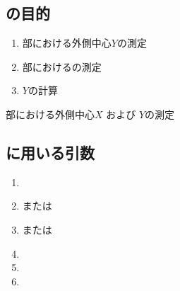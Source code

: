 \subsection{\MYOThickness の目的}
\begin{enumerate}[label*=\sarrow]
\item \EndFace 部における外側中心$Y$の測定
\item \EndFace 部における\BDOD の測定
\item \KeywayCenter$Y$の計算
\end{enumerate}
\EndFace 部における外側中心$X$ および \HorizontalOD$Y$の測定


\subsection{\MYOThickness に用いる引数\TBW}
\begin{enumerate}[label*=\sarrow]
\item \PMACOD
\item \PMTopReAlocationLength または\PMBottomReAlocationLength
\item \PMTopAlocationLength または\PMBottomAlocationLength
\item \PMCenterCurvatureRadius
\item \PMKeywayPos
\item \PMKeywayWidth
\end{enumerate}



